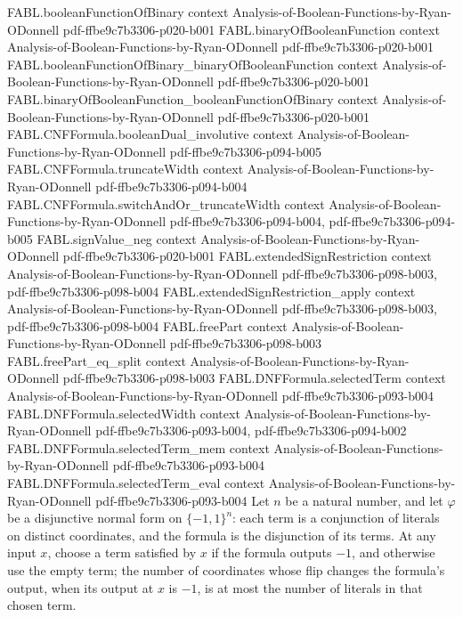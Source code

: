 \begin{theorem}
\proofstep
  {FABL.booleanFunctionOfBinary}
  {context}
  {Analysis-of-Boolean-Functions-by-Ryan-ODonnell}
  {pdf-ffbe9c7b3306-p020-b001}
\proofstep
  {FABL.binaryOfBooleanFunction}
  {context}
  {Analysis-of-Boolean-Functions-by-Ryan-ODonnell}
  {pdf-ffbe9c7b3306-p020-b001}
\proofstep
  {FABL.booleanFunctionOfBinary_binaryOfBooleanFunction}
  {context}
  {Analysis-of-Boolean-Functions-by-Ryan-ODonnell}
  {pdf-ffbe9c7b3306-p020-b001}
\proofstep
  {FABL.binaryOfBooleanFunction_booleanFunctionOfBinary}
  {context}
  {Analysis-of-Boolean-Functions-by-Ryan-ODonnell}
  {pdf-ffbe9c7b3306-p020-b001}
\proofstep
  {FABL.CNFFormula.booleanDual_involutive}
  {context}
  {Analysis-of-Boolean-Functions-by-Ryan-ODonnell}
  {pdf-ffbe9c7b3306-p094-b005}
\proofstep
  {FABL.CNFFormula.truncateWidth}
  {context}
  {Analysis-of-Boolean-Functions-by-Ryan-ODonnell}
  {pdf-ffbe9c7b3306-p094-b004}
\proofstep
  {FABL.CNFFormula.switchAndOr_truncateWidth}
  {context}
  {Analysis-of-Boolean-Functions-by-Ryan-ODonnell}
  {pdf-ffbe9c7b3306-p094-b004,
    pdf-ffbe9c7b3306-p094-b005}
\proofstep
  {FABL.signValue_neg}
  {context}
  {Analysis-of-Boolean-Functions-by-Ryan-ODonnell}
  {pdf-ffbe9c7b3306-p020-b001}
\proofstep
  {FABL.extendedSignRestriction}
  {context}
  {Analysis-of-Boolean-Functions-by-Ryan-ODonnell}
  {pdf-ffbe9c7b3306-p098-b003,
    pdf-ffbe9c7b3306-p098-b004}
\proofstep
  {FABL.extendedSignRestriction_apply}
  {context}
  {Analysis-of-Boolean-Functions-by-Ryan-ODonnell}
  {pdf-ffbe9c7b3306-p098-b003,
    pdf-ffbe9c7b3306-p098-b004}
\proofstep
  {FABL.freePart}
  {context}
  {Analysis-of-Boolean-Functions-by-Ryan-ODonnell}
  {pdf-ffbe9c7b3306-p098-b003}
\proofstep
  {FABL.freePart_eq_split}
  {context}
  {Analysis-of-Boolean-Functions-by-Ryan-ODonnell}
  {pdf-ffbe9c7b3306-p098-b003}
\proofstep
  {FABL.DNFFormula.selectedTerm}
  {context}
  {Analysis-of-Boolean-Functions-by-Ryan-ODonnell}
  {pdf-ffbe9c7b3306-p093-b004}
\proofstep
  {FABL.DNFFormula.selectedWidth}
  {context}
  {Analysis-of-Boolean-Functions-by-Ryan-ODonnell}
  {pdf-ffbe9c7b3306-p093-b004,
    pdf-ffbe9c7b3306-p094-b002}
\proofstep
  {FABL.DNFFormula.selectedTerm_mem}
  {context}
  {Analysis-of-Boolean-Functions-by-Ryan-ODonnell}
  {pdf-ffbe9c7b3306-p093-b004}
\proofstep
  {FABL.DNFFormula.selectedTerm_eval}
  {context}
  {Analysis-of-Boolean-Functions-by-Ryan-ODonnell}
  {pdf-ffbe9c7b3306-p093-b004}
Let $n$ be a natural number, and let $\varphi$ be a disjunctive normal form on
$\{-1,1\}^n$: each term is a conjunction of literals on distinct coordinates, and the
formula is the disjunction of its terms. At any input $x$, choose a term satisfied by
$x$ if the formula outputs $-1$, and otherwise use the empty term; the number of
coordinates whose flip changes the formula's output, when its output at $x$ is $-1$, is
at most the number of literals in that chosen term.
\end{theorem}

